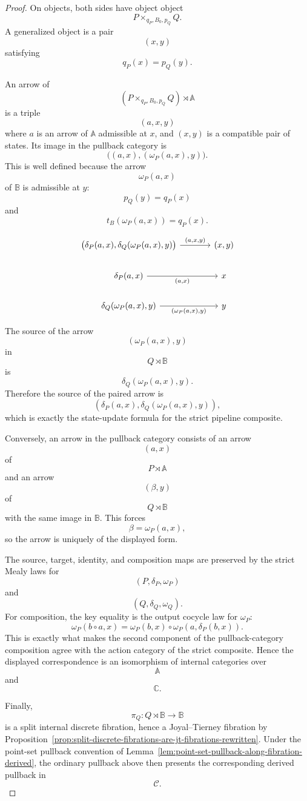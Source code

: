 \begin{proof}
On objects, both sides have object object
\[
P\times_{q_P,B_0,p_Q}Q.
\]
A generalized object is a pair
\[
(x,y)
\]
satisfying
\[
q_P(x)=p_Q(y).
\]

An arrow of
\[
(P\times_{q_P,B_0,p_Q}Q)\rtimes\mathbb A
\]
is a triple
\[
(a,x,y)
\]
where \(a\) is an arrow of \(\mathbb A\) admissible at \(x\), and
\((x,y)\) is a compatible pair of states. Its image in the pullback
category is
\[
\bigl((a,x),(\omega_P(a,x),y)\bigr).
\]
This is well defined because the arrow
\[
\omega_P(a,x)
\]
of \(\mathbb B\) is admissible at \(y\):
\[
p_Q(y)=q_P(x)
\]
and
\[
t_B(\omega_P(a,x))=q_P(x).
\]

\[
\begin{tikzcd}[column sep=large]
\bigl(
\delta_P(a,x),
\delta_Q(\omega_P(a,x),y)
\bigr)
\arrow[r, "{(a,x,y)}"]
&
(x,y)
\\
\delta_P(a,x)
\arrow[r, "{(a,x)}"']
&
x
\\
\delta_Q(\omega_P(a,x),y)
\arrow[r, "{(\omega_P(a,x),y)}"']
&
y
\end{tikzcd}
\]

The source of the arrow
\[
(\omega_P(a,x),y)
\]
in
\[
Q\rtimes\mathbb B
\]
is
\[
\delta_Q(\omega_P(a,x),y).
\]
Therefore the source of the paired arrow is
\[
\left(
\delta_P(a,x),
\delta_Q(\omega_P(a,x),y)
\right),
\]
which is exactly the state-update formula for the strict pipeline
composite.

Conversely, an arrow in the pullback category consists of an arrow
\[
(a,x)
\]
of
\[
P\rtimes\mathbb A
\]
and an arrow
\[
(\beta,y)
\]
of
\[
Q\rtimes\mathbb B
\]
with the same image in \(\mathbb B\). This forces
\[
\beta=\omega_P(a,x),
\]
so the arrow is uniquely of the displayed form.

The source, target, identity, and composition maps are preserved by the
strict Mealy laws for
\[
(P,\delta_P,\omega_P)
\]
and
\[
(Q,\delta_Q,\omega_Q).
\]
For composition, the key equality is the output cocycle law for
\(\omega_P\):
\[
\omega_P(b\circ a,x)
=
\omega_P(b,x)\circ\omega_P(a,\delta_P(b,x)).
\]
This is exactly what makes the second component of the pullback-category
composition agree with the action category of the strict composite.
Hence the displayed correspondence is an isomorphism of internal
categories over
\[
\mathbb A
\]
and
\[
\mathbb C.
\]

Finally,
\[
\pi_Q:Q\rtimes\mathbb B\to\mathbb B
\]
is a split internal discrete fibration, hence a Joyal--Tierney fibration
by Proposition~\ref{prop:split-discrete-fibrations-are-jt-fibrations-rewritten}.
Under the point-set pullback convention of
Lemma~\ref{lem:point-set-pullback-along-fibration-derived}, the ordinary
pullback above then presents the corresponding derived pullback in
\[
\mathcal C.
\]
\end{proof}

